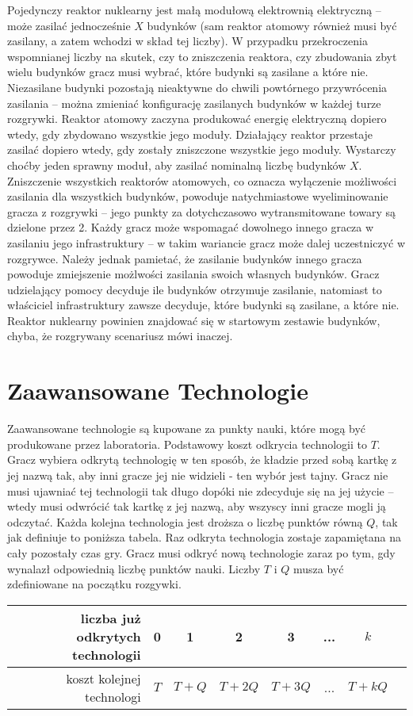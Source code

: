 \documentclass[11pt,a4paper]{article}
\begin{document}
Pojedynczy reaktor nuklearny jest małą modułową elektrownią elektryczną -- może zasilać jednocześnie $X$ budynków (sam reaktor atomowy również musi być zasilany, a zatem wchodzi w skład tej liczby). W przypadku przekroczenia wspomnianej liczby na skutek, czy to zniszczenia reaktora, czy zbudowania zbyt wielu budynków gracz musi wybrać, które budynki są zasilane a które nie. Niezasilane budynki pozostają nieaktywne do chwili powtórnego przywrócenia zasilania -- można zmieniać konfigurację zasilanych budynków w każdej turze rozgrywki. Reaktor atomowy zaczyna produkować energię elektryczną dopiero wtedy, gdy zbydowano wszystkie jego moduły. Działający reaktor przestaje zasilać dopiero wtedy, gdy zostały zniszczone wszystkie jego moduły. Wystarczy choćby jeden sprawny moduł, aby zasilać nominalną liczbę budynków $X$. Zniszczenie wszystkich reaktorów atomowych, co oznacza wyłączenie możliwości zasilania dla wszystkich budynków, powoduje natychmiastowe wyeliminowanie gracza z rozgrywki -- jego punkty za dotychczasowo wytransmitowane towary są dzielone przez 2. Każdy gracz może wspomagać dowolnego innego gracza w zasilaniu jego infrastruktury -- w takim wariancie gracz może dalej uczestniczyć w rozgrywce. Należy jednak pamietać, że zasilanie budynków innego gracza powoduje zmiejszenie możlwości zasilania swoich własnych budynków. Gracz udzielający pomocy decyduje ile budynków otrzymuje zasilanie, natomiast to właściciel infrastruktury zawsze decyduje, które budynki są zasilane, a które nie. Reaktor nuklearny powinien znajdować się w startowym zestawie budynków, chyba, że rozgrywany scenariusz mówi inaczej.

\section{Zaawansowane Technologie}

Zaawansowane technologie są kupowane za punkty nauki, które mogą być produkowane przez laboratoria. Podstawowy koszt odkrycia technologii to $T$. Gracz wybiera odkrytą technologię w ten sposób, że kładzie przed sobą kartkę z jej nazwą tak, aby inni gracze jej nie widzieli - ten wybór jest tajny. Gracz nie musi ujawniać tej technologii tak długo dopóki nie zdecyduje się na jej użycie -- wtedy musi odwrócić tak kartkę z jej nazwą, aby wszyscy inni gracze mogli ją odczytać. Każda kolejna technologia jest droższa o liczbę punktów równą $Q$, tak jak definiuje to poniższa tabela. Raz odkryta technologia zostaje zapamiętana na cały pozostały czas gry. Gracz musi odkryć nową technologie zaraz po tym, gdy wynalazł odpowiednią liczbę punktów nauki. Liczby $T$ i $Q$ musza być zdefiniowane na początku rozgywki.
\begin{center}
  \begin{tabular}{| r | c | c | c | c | c | c | c |}
    \hline
    liczba już odkrytych technologii & 0 & 1 & 2 & 3  & ... & $k$ \\
    \hline
    koszt kolejnej technologi & $T$ & $T+Q$ & $T+2Q$ & $T+3Q$ & ... & $T+kQ$ \\
    \hline
  \end{tabular}
\end{center}
\end{document}
